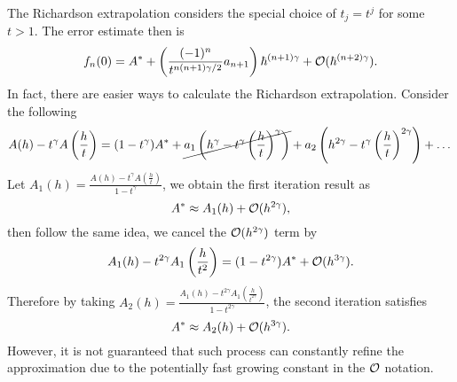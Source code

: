 The {Richardson extrapolation} considers the special choice of $t_j = t^j$ for some $t > 1$. The error estimate then is 
\begin{equation}
    f_n(0) = A^{\ast} + \left(\frac{(-1)^n}{t^{n(n+1)\gamma/2}} a_{n+1}\right) \hbar^{(n+1)\gamma} + \mathcal O(\hbar^{(n+2)\gamma}).
\end{equation}
In fact, there are easier ways to calculate the Richardson extrapolation. Consider the following
\begin{equation}
    A(h) - t^{\gamma} A\left(\frac{h}{t}\right) = (1 - t^{\gamma}) A^{\ast} + \cancel{a_1 \left(h^{\gamma} - t^{\gamma} \left(\frac{h}{t}\right)^{\gamma}\right)} + a_2\left(h^{2\gamma} - t^{\gamma}\left(\frac{h}{t}\right)^{2\gamma}\right) +\dots
\end{equation}
Let $A_1(h) = \frac{A(h) - t^{\gamma} A(\frac{h}{t}) }{1 - t^{\gamma}} $, we obtain the first iteration result as 
\begin{equation}
    A^{\ast} \approx A_1(h) + \mathcal O(h^{2\gamma}),
\end{equation}
then follow the same idea, we cancel the $\mathcal O(h^{2\gamma})$ term by
\begin{equation}
    A_1(h) - t^{2\gamma} A_1\left(\frac{h}{t^2}\right) = (1 - t^{2\gamma}) A^{\ast} + \mathcal O(h^{3\gamma}).
\end{equation}
Therefore by taking $A_2(h) = \frac{A_1(h)- t^{2\gamma} A_1(\frac{h}{t^{2\gamma}})}{1 - t^{2\gamma}}$, the second iteration satisfies 
\begin{equation}
    A^{\ast}\approx A_2(h) + \mathcal O(h^{3\gamma}).
\end{equation}
However, it is not guaranteed that such process can constantly refine the approximation due to the potentially fast growing constant in the $\mathcal O$ notation.

